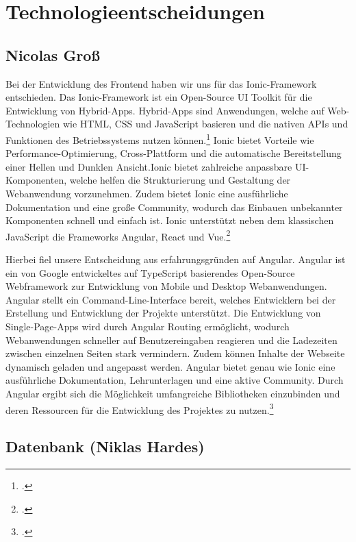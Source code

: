 
\section{Technologieentscheidungen}

\subsection*{Nicolas Groß}

Bei der Entwicklung des Frontend haben wir uns für das Ionic-Framework entschieden. Das Ionic-Framework ist ein Open-Source UI Toolkit für die Entwicklung von Hybrid-Apps. Hybrid-Apps sind Anwendungen, welche auf Web-Technologien wie HTML, CSS und JavaScript basieren und die nativen APIs und Funktionen des Betriebssystems nutzen können.\footcite[.vgl]{HybrideWebApp}  Ionic bietet Vorteile wie Performance-Optimierung, Cross-Plattform und die automatische Bereitstellung einer Hellen und Dunklen Ansicht.Ionic bietet zahlreiche anpassbare UI-Komponenten, welche helfen die Strukturierung und Gestaltung der Webanwendung vorzunehmen. Zudem bietet Ionic eine ausführliche Dokumentation und eine große Community, wodurch das Einbauen unbekannter Komponenten schnell und einfach ist. Ionic unterstützt neben dem klassischen JavaScript die Frameworks Angular, React und Vue.\footcite[.vgl]{Ionic2013}

Hierbei fiel unsere Entscheidung aus erfahrungsgründen auf Angular. Angular ist ein von Google entwickeltes auf TypeScript basierendes Open-Source Webframework zur Entwicklung von Mobile und Desktop Webanwendungen. Angular stellt ein Command-Line-Interface bereit, welches Entwicklern bei der Erstellung und Entwicklung der Projekte unterstützt. Die Entwicklung von Single-Page-Apps wird durch Angular Routing ermöglicht, wodurch Webanwendungen schneller auf Benutzereingaben reagieren und die Ladezeiten zwischen einzelnen Seiten stark vermindern. Zudem können Inhalte der Webseite dynamisch geladen und angepasst werden. Angular bietet genau wie Ionic eine ausführliche Dokumentation, Lehrunterlagen und eine aktive Community. Durch Angular ergibt sich die Möglichkeit umfangreiche Bibliotheken einzubinden und deren Ressourcen für die Entwicklung des Projektes zu nutzen.\footcite[.vgl]{Angular2016}

\subsection*{Datenbank (Niklas Hardes)}

